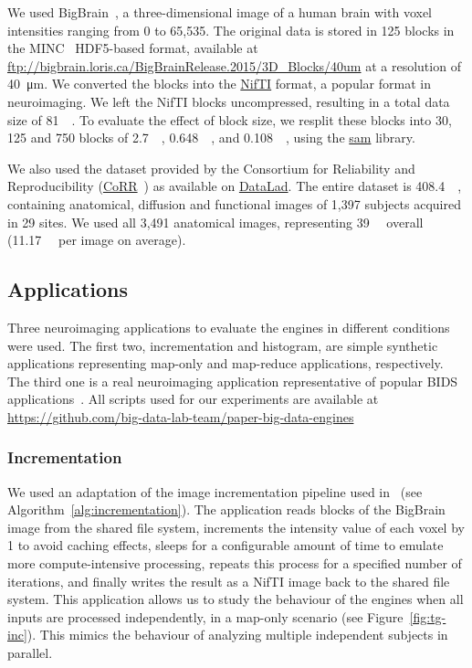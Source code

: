 \documentclass[conference]{IEEEtran}
\begin{document}
We used BigBrain~\cite{Amunts:13}, a three-dimensional image of a human
brain with voxel intensities ranging from 0 to 65,535. The original data is
stored in 125 blocks in the MINC~\cite{minc} HDF5-based format, available
at \url{ftp://bigbrain.loris.ca/BigBrainRelease.2015/3D\_Blocks/40um} at a
resolution of \SI{40}{\micro\metre}. We converted the blocks into the
\href{https://nifti.nimh.nih.gov/nifti-1}{NifTI} format, a popular format
in neuroimaging. We left the NifTI blocks uncompressed, resulting in 
a total data size of \SI{81}{\giga\byte}. 
To evaluate the effect of block size, we resplit these blocks into 30, 125 and 750 blocks of 
\SI{2.7}{\giga\byte}, \SI{0.648}{\giga\byte}, and
\SI{0.108}{\giga\byte}, using the \href{https://github.com/big-data-lab-team/sam}{sam} library.

We also used the dataset provided by the Consortium for Reliability and
Reproducibility (\href{http://fcon_1000.projects.nitrc.org/indi/CoRR/html/}{CoRR}~\cite{zuo2014open}) as
available on \href{http://datasets.datalad.org/?dir=/corr/RawDataBIDS}{DataLad}. The
entire dataset is \SI{408.4}{\giga\byte}, containing anatomical, diffusion and
functional images of 1,397 subjects acquired in 29 sites. We used all 3,491 anatomical
images, representing \SI{39}{\giga\byte} overall (\SI{11.17}{\mega\byte} per image on
average).


\subsection{Applications}

Three neuroimaging applications to evaluate the engines in different
conditions were used. The first two, incrementation and histogram, are simple 
synthetic applications representing map-only and map-reduce applications,
respectively. The third one is a real neuroimaging application representative
of popular BIDS applications~\cite{gorgolewski2017bids}. All scripts used for our
experiments are available at
\url{https://github.com/big-data-lab-team/paper-big-data-engines}

\subsubsection{Incrementation}
We used an adaptation of the image incrementation pipeline used
in~\cite{hayot2019performance} (see Algorithm~\ref{alg:incrementation}).
The application reads blocks of the BigBrain image from the shared file
system, increments the intensity value of each voxel by 1 to avoid caching
effects, sleeps for a configurable amount of time to emulate more
compute-intensive processing, repeats this process for a specified number of
iterations, and
finally writes the result as a NifTI image back to the shared file system.
This application allows us to study the behaviour of the engines when all
inputs are processed independently, in a map-only scenario (see
Figure~\ref{fig:tg-inc}). This mimics the behaviour of analyzing multiple
independent subjects in parallel.
\end{document}
